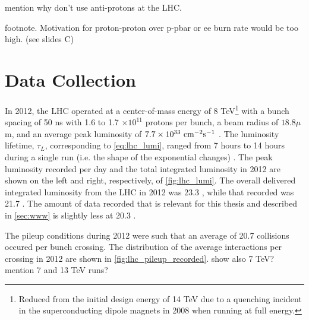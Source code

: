 mention why don't use anti-protons at the LHC.

footnote. Motivation for proton-proton over p-pbar or ee burn rate would be too high. (see slides C)


\section{Data Collection}
In 2012, the LHC operated at a center-of-mass energy of 8 TeV\footnote{Reduced
from the initial design energy of 14 TeV due to a quenching incident
in the superconducting dipole magnets in 2008 when running at full energy.}
with a bunch spacing of 50 ns with 1.6 to 1.7 $\times 10^{11}$ protons
per bunch, a beam radius of $18.8 \mu$m, and an average peak 
luminosity of $7.7 \times 10^{33}~\textrm{cm}^{-2}\textrm{s}^{-1}$ \cite{Lamont:1709796}.
The luminosity lifetime, $\tau_L$, corresponding to \eqn\eqref{eq:lhc_lumi},
ranged from 7 hours to 14 hours during a single run (i.e. the shape
of the exponential changes) \cite{Hostettler:2013qya}.
The peak luminosity recorded per day and the total integrated luminosity 
in 2012 are shown 
on the left and right, respectively, of \fig\ref{fig:lhc_lumi}.
The overall delivered integrated luminosity from the LHC
in 2012 was 23.3 \ifb, while that recorded was 21.7 \ifb. The 
amount of data recorded that is relevant for this thesis
and described in \sec\ref{sec:www} is slightly less at 20.3 \ifb.

The pileup conditions during 2012 were such that an average
of 20.7 collisions occured per bunch crossing. The distribution
of the average interactions per crossing in 2012 are shown in 
\fig\ref{fig:lhc_pileup_recorded}.
show also 7 TeV? mention 7 and 13 TeV runs?


